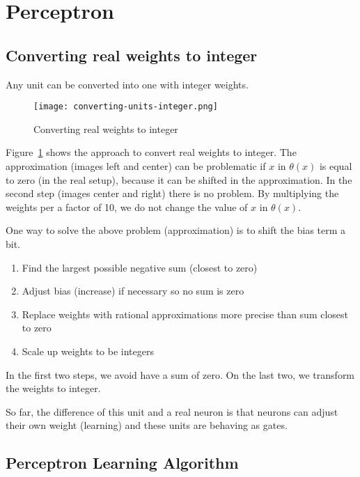 \documentclass[main]{subfiles}
\begin{document}

\section{Perceptron}

\subsection{Converting real weights to integer}
Any unit can be converted into one with integer weights.

\begin{figure}[H]
	\centering
	\texttt{[image: converting-units-integer.png]}
	\caption{Converting real weights to integer}
	\label{fig:converting}
\end{figure}

Figure~\ref{fig:converting} shows the approach to convert real weights to integer. The approximation (images left and center) can be problematic if $x$ in $\theta(x)$ is equal to zero (in the real setup), because it can be shifted in the approximation.
In the second step (images center and right) there is no problem. By multiplying the weights per a factor of 10, we do not change the value of $x$ in $\theta(x)$.

One way to solve the above problem (approximation) is to shift the bias term a bit.

\begin{enumerate}
\item Find the largest possible negative sum (closest to zero)
\item Adjust bias (increase) if necessary so no sum is zero
\item Replace weights with rational approximations more precise than sum closest to zero
\item Scale up weights to be integers
\end{enumerate}

In the first two steps, we avoid have a sum of zero. On the last two, we transform the weights to integer.

So far, the difference of this unit and a real neuron is that neurons can adjust their own weight (learning) and these units are behaving as gates.

\subsection{Perceptron Learning Algorithm}
\end{document}
